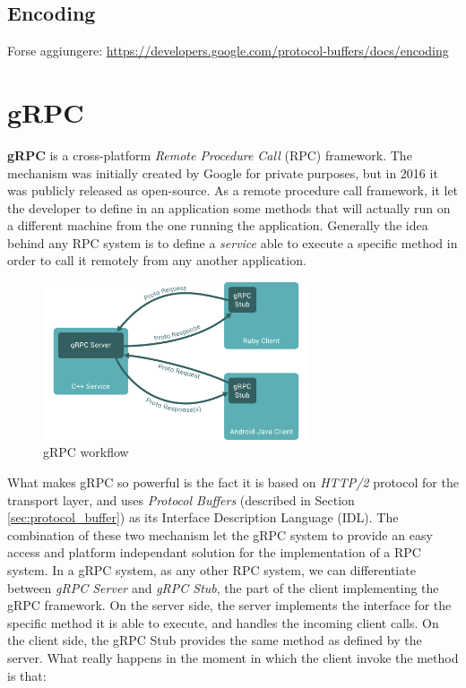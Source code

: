 		\subsection{Encoding}
			
		\par Forse aggiungere:	\url{https://developers.google.com/protocol-buffers/docs/encoding}

	\section{gRPC}
		\par \textbf{gRPC} \cite{grpc} is a cross-platform \textit{Remote Procedure Call} (RPC) framework. The mechanism was initially created by Google for private purposes, but in 2016 it was publicly released as open-source. As a remote procedure call framework, it let the developer to define in an application some methods that will actually run on a different machine from the one running the application. Generally the idea behind any RPC system is to define a \textit{service} able to execute a specific method in order to call it remotely from any another application.
		\begin{figure}[ht]
			\centering
			\includegraphics[width=0.7\textwidth]{images/grpc.png}
			\caption{gRPC workflow \cite{grpc}}
		\end{figure}		
		\par What makes gRPC so powerful is the fact it is based on \textit{HTTP/2} protocol for the transport layer, and uses \textit{Protocol Buffers} (described in Section \ref{sec:protocol_buffer}) as its Interface Description Language (IDL). The combination of these two mechanism let the gRPC system to provide an easy access and platform independant solution for the implementation of a RPC system. \newline
		In a gRPC system, as any other RPC system, we can differentiate between \textit{gRPC Server} and \textit{gRPC Stub}, the part of the client implementing the gRPC framework. On the server side, the server implements the interface for the specific method it is able to execute, and handles the incoming client calls. On the client side, the gRPC Stub provides the same method as defined by the server. What really happens in the moment in which the client invoke the method is that:

